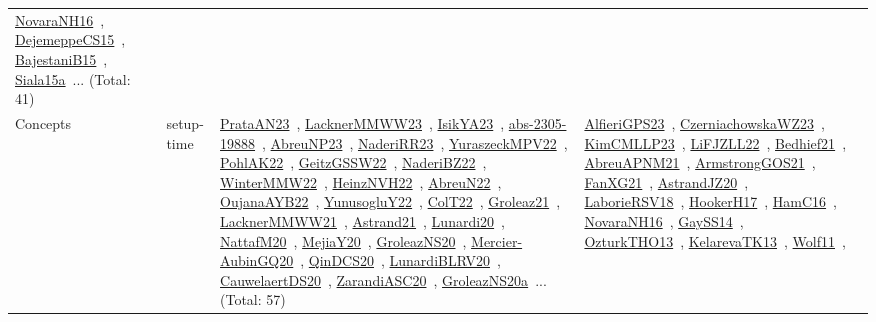 {\begin{longtable}{lp{3cm}>{\raggedright\arraybackslash}p{6cm}>{\raggedright\arraybackslash}p{6cm}>{\raggedright\arraybackslash}p{8cm}}
\href{works/NovaraNH16.pdf}{NovaraNH16}~\cite{NovaraNH16}, \href{works/DejemeppeCS15.pdf}{DejemeppeCS15}~\cite{DejemeppeCS15}, \href{works/BajestaniB15.pdf}{BajestaniB15}~\cite{BajestaniB15}, \href{works/Siala15a.pdf}{Siala15a}~\cite{Siala15a}... (Total: 41)\\
Concepts & setup-time & \href{works/PrataAN23.pdf}{PrataAN23}~\cite{PrataAN23}, \href{works/LacknerMMWW23.pdf}{LacknerMMWW23}~\cite{LacknerMMWW23}, \href{works/IsikYA23.pdf}{IsikYA23}~\cite{IsikYA23}, \href{works/abs-2305-19888.pdf}{abs-2305-19888}~\cite{abs-2305-19888}, \href{works/AbreuNP23.pdf}{AbreuNP23}~\cite{AbreuNP23}, \href{works/NaderiRR23.pdf}{NaderiRR23}~\cite{NaderiRR23}, \href{works/YuraszeckMPV22.pdf}{YuraszeckMPV22}~\cite{YuraszeckMPV22}, \href{works/PohlAK22.pdf}{PohlAK22}~\cite{PohlAK22}, \href{works/GeitzGSSW22.pdf}{GeitzGSSW22}~\cite{GeitzGSSW22}, \href{works/NaderiBZ22.pdf}{NaderiBZ22}~\cite{NaderiBZ22}, \href{works/WinterMMW22.pdf}{WinterMMW22}~\cite{WinterMMW22}, \href{works/HeinzNVH22.pdf}{HeinzNVH22}~\cite{HeinzNVH22}, \href{works/AbreuN22.pdf}{AbreuN22}~\cite{AbreuN22}, \href{works/OujanaAYB22.pdf}{OujanaAYB22}~\cite{OujanaAYB22}, \href{works/YunusogluY22.pdf}{YunusogluY22}~\cite{YunusogluY22}, \href{works/ColT22.pdf}{ColT22}~\cite{ColT22}, \href{works/Groleaz21.pdf}{Groleaz21}~\cite{Groleaz21}, \href{works/LacknerMMWW21.pdf}{LacknerMMWW21}~\cite{LacknerMMWW21}, \href{works/Astrand21.pdf}{Astrand21}~\cite{Astrand21}, \href{works/Lunardi20.pdf}{Lunardi20}~\cite{Lunardi20}, \href{works/NattafM20.pdf}{NattafM20}~\cite{NattafM20}, \href{works/MejiaY20.pdf}{MejiaY20}~\cite{MejiaY20}, \href{works/GroleazNS20.pdf}{GroleazNS20}~\cite{GroleazNS20}, \href{works/Mercier-AubinGQ20.pdf}{Mercier-AubinGQ20}~\cite{Mercier-AubinGQ20}, \href{works/QinDCS20.pdf}{QinDCS20}~\cite{QinDCS20}, \href{works/LunardiBLRV20.pdf}{LunardiBLRV20}~\cite{LunardiBLRV20}, \href{works/CauwelaertDS20.pdf}{CauwelaertDS20}~\cite{CauwelaertDS20}, \href{works/ZarandiASC20.pdf}{ZarandiASC20}~\cite{ZarandiASC20}, \href{works/GroleazNS20a.pdf}{GroleazNS20a}~\cite{GroleazNS20a}... (Total: 57) & \href{works/AlfieriGPS23.pdf}{AlfieriGPS23}~\cite{AlfieriGPS23}, \href{works/CzerniachowskaWZ23.pdf}{CzerniachowskaWZ23}~\cite{CzerniachowskaWZ23}, \href{works/KimCMLLP23.pdf}{KimCMLLP23}~\cite{KimCMLLP23}, \href{works/LiFJZLL22.pdf}{LiFJZLL22}~\cite{LiFJZLL22}, \href{works/Bedhief21.pdf}{Bedhief21}~\cite{Bedhief21}, \href{works/AbreuAPNM21.pdf}{AbreuAPNM21}~\cite{AbreuAPNM21}, \href{works/ArmstrongGOS21.pdf}{ArmstrongGOS21}~\cite{ArmstrongGOS21}, \href{works/FanXG21.pdf}{FanXG21}~\cite{FanXG21}, \href{works/AstrandJZ20.pdf}{AstrandJZ20}~\cite{AstrandJZ20}, \href{works/LaborieRSV18.pdf}{LaborieRSV18}~\cite{LaborieRSV18}, \href{works/HookerH17.pdf}{HookerH17}~\cite{HookerH17}, \href{works/HamC16.pdf}{HamC16}~\cite{HamC16}, \href{works/NovaraNH16.pdf}{NovaraNH16}~\cite{NovaraNH16}, \href{works/GaySS14.pdf}{GaySS14}~\cite{GaySS14}, \href{works/OzturkTHO13.pdf}{OzturkTHO13}~\cite{OzturkTHO13}, \href{works/KelarevaTK13.pdf}{KelarevaTK13}~\cite{KelarevaTK13}, \href{works/Wolf11.pdf}{Wolf11}~\cite{Wolf11}, 
\end{longtable}}
